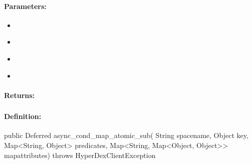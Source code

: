 \paragraph{Parameters:}
\begin{itemize}[noitemsep]
\item {}\\

\item {}\\

\item {}\\

\item {}\\

\end{itemize}

\paragraph{Returns:}


\pagebreak
\subsubsection{}
\label{api:java:async_cond_map_atomic_sub}


\paragraph{Definition:}
\begin{javacode}
public Deferred async_cond_map_atomic_sub(
        String spacename,
        Object key,
        Map<String, Object> predicates,
        Map<String, Map<Object, Object>> mapattributes) throws HyperDexClientException
\end{javacode}

